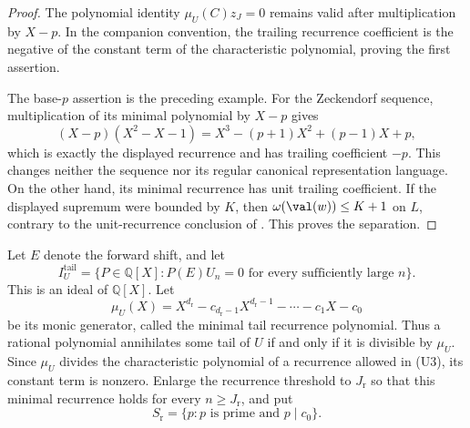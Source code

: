 \begin{proof}
  The polynomial identity \(\mu_U(C)z_J=0\) remains valid after
  multiplication by \(X-p\).  In the companion convention, the trailing
  recurrence coefficient is the negative of the constant term of the
  characteristic polynomial, proving the first assertion.

  The base-\(p\) assertion is the preceding example.  For the Zeckendorf
  sequence, multiplication of its minimal polynomial by \(X-p\) gives
  \[
    (X-p)(X^2-X-1)
      =X^3-(p+1)X^2+(p-1)X+p,
  \]
  which is exactly the displayed recurrence and has trailing coefficient
  \(-p\).  This changes neither the sequence nor its regular canonical
  representation language.  On the other hand, its minimal recurrence
  has unit trailing coefficient.  If the displayed supremum were bounded
  by \(K\), then
  \(\omega(\val(w))\le K+1\) on \(L\), contrary to the unit-recurrence
  conclusion of
  .  This proves the separation.
\end{proof}

Let \(E\) denote the forward shift, and let
\[
  I_U^{\mathrm{tail}}
    =\{P\in\mathbb Q[X]:P(E)U_n=0\text{ for every sufficiently large }n\}.
\]
This is an ideal of \(\mathbb Q[X]\). Let
\[
  \mu_U(X)=X^{d_{\mathrm r}}-c_{d_{\mathrm r}-1}X^{d_{\mathrm r}-1}
    -\cdots-c_1X-c_0
\]
be its monic generator, called the minimal tail recurrence polynomial.
Thus a rational polynomial annihilates some tail of \(U\) if and only if
it is divisible by \(\mu_U\). Since \(\mu_U\)
divides the characteristic polynomial of a recurrence allowed in
\textup{(U3)}, its constant term is nonzero. Enlarge the recurrence
threshold to \(J_{\mathrm r}\) so that this minimal recurrence holds for
every \(n\ge J_{\mathrm r}\), and put
\[
  S_{\mathrm r}=\{p:p\text{ is prime and }p\mid c_0\}.
\]
